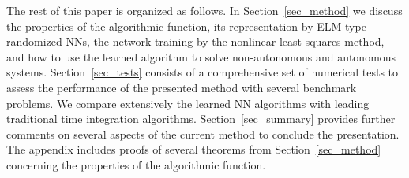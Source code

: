 The rest of this paper is organized as follows.
In Section~\ref{sec_method} we discuss the properties of the algorithmic function,
its representation by ELM-type randomized NNs,
the network training by the nonlinear least squares method,
and how to use the learned algorithm
to solve non-autonomous and autonomous systems.
Section~\ref{sec_tests} consists of a comprehensive set of numerical tests
to assess the performance of the presented method with several benchmark problems.
We compare extensively the learned NN algorithms
with leading traditional time integration algorithms.
Section~\ref{sec_summary} provides further comments on several aspects of the current
method to  conclude the presentation.
The appendix includes proofs of several theorems from Section~\ref{sec_method}
concerning the properties of the algorithmic function.

